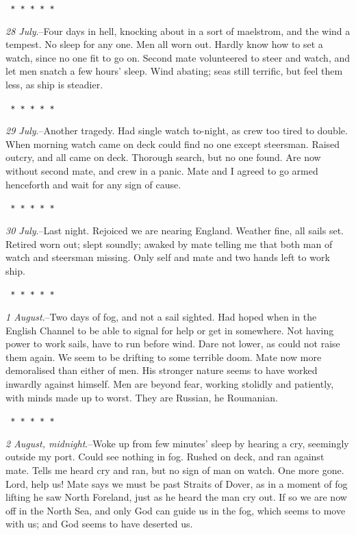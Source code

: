 \documentclass[12pt,openright]{book}
\begin{document}
\texttt{   *       *       *       *       *}

\textit{28 July}.–Four days in hell, knocking about in a sort of maelstrom, and the wind a tempest. No sleep for any one. Men all worn out. Hardly know how to set a watch, since no one fit to go on. Second mate volunteered to steer and watch, and let men snatch a few hours’ sleep. Wind abating; seas still terrific, but feel them less, as ship is steadier.

\texttt{   *       *       *       *       *}

\textit{29 July}.–Another tragedy. Had single watch to-night, as crew too tired to double. When morning watch came on deck could find no one except steersman. Raised outcry, and all came on deck. Thorough search, but no one found. Are now without second mate, and crew in a panic. Mate and I agreed to go armed henceforth and wait for any sign of cause.

\texttt{   *       *       *       *       *}

\textit{30 July}.–Last night. Rejoiced we are nearing England. Weather fine, all sails set. Retired worn out; slept soundly; awaked by mate telling me that both man of watch and steersman missing. Only self and mate and two hands left to work ship.

\texttt{   *       *       *       *       *}

\textit{1 August}.–Two days of fog, and not a sail sighted. Had hoped when in the English Channel to be able to signal for help or get in somewhere. Not having power to work sails, have to run before wind. Dare not lower, as could not raise them again. We seem to be drifting to some terrible doom. Mate now more demoralised than either of men. His stronger nature seems to have worked inwardly against himself. Men are beyond fear, working stolidly and patiently, with minds made up to worst. They are Russian, he Roumanian.

\texttt{   *       *       *       *       *}

\textit{2 August, midnight}.–Woke up from few minutes’ sleep by hearing a cry, seemingly outside my port. Could see nothing in fog. Rushed on deck, and ran against mate. Tells me heard cry and ran, but no sign of man on watch. One more gone. Lord, help us! Mate says we must be past Straits of Dover, as in a moment of fog lifting he saw North Foreland, just as he heard the man cry out. If so we are now off in the North Sea, and only God can guide us in the fog, which seems to move with us; and God seems to have deserted us.
\end{document}
